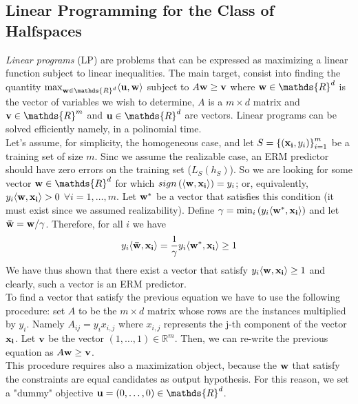 \documentclass[12pt]{report}
\theoremstyle{plain}
\newcommand\sprod[2]{\langle \vb{#1},\vb{#2}\rangle}
\begin{document}
\begin{flushleft}
\subsection{Linear Programming for the Class of Halfspaces}
\textit{Linear programs} (LP) are problems that can be expressed as maximizing 
a linear function subject to linear inequalities. The main target, consist into 
finding the quantity $\max_{\vb{w}\in\mathds{R}^d} \sprod{u}{w}$ subject to 
$A\vb{w}\geq\vb{v}$ where $\vb{w}\in\mathds{R}^d$ is the vector of variables we 
wish to determine, $A$ is a $m\times d$ matrix and $\vb{v}\in\mathds{R}^m$ and 
$\vb{u}\in\mathds{R}^d$ are vectors. Linear programs can be solved efficiently 
namely, in a polinomial time.\\
Let's assume, for simplicity, the homogeneous case, and let 
$S=\left\{(\vb{x_i},y_i)\right\}_{i=1}^m$ be a training set of size $m$. Sinc 
we assume the realizable case, an ERM predictor should have zero errors on the 
training set ($L_S(h_S)$). So we are looking for some vector 
$\vb{w}\in\mathds{R}^d$ for which $sign\left(\sprod{w}{x_i}\right)=y_i$; or, 
equivalently, $y_i\sprod{w}{x_i}>0$ $\forall i=1,\dots,m$. Let $\vb{w^*}$ be a 
vector that satisfies this condition (it must exist since we assumed 
realizability). Define $\gamma=\min_i\left(y_i\sprod{w^*}{x_i}\right)$ and let 
$\vb{\bar{w}}=\vb{w}/\gamma$. Therefore, for all $i$ we have
\[ y_i\sprod{\bar{w}}{x_i}= \frac{1}{\gamma}y_i\sprod{w^*}{x_i}\geq 1 \]
We have thus shown that there exist a vector that satisfy  
$y_i\sprod{w}{x_i}\geq 1$ and clearly, such a vector is an ERM predictor.\\
To find a vector that satisfy the previous equation we have to use the 
following procedure: set $A$ to be the $m\times d$ matrix whose rows are the 
instances multiplied by $y_i$. Namely $A_{ij}=y_i x_{i,j}$ where $x_{i,j}$ 
represents the j-th component of the vector $\vb{x_i}$. Let $\vb{v}$ be the 
vector $(1,\dots,1)\in\mathds{R}^m$. Then, we can re-write the previous 
equation as $A\vb{w}\geq\vb{v}$.\\
This procedure requires also a maximization object, because the $\vb{w}$ that 
satisfy the constraints are equal candidates as output hypothesis. For this 
reason, we set a "dummy" objective $\vb{u}=(0,\dots,0)\in\mathds{R}^d$.


\end{flushleft}
\end{document}
